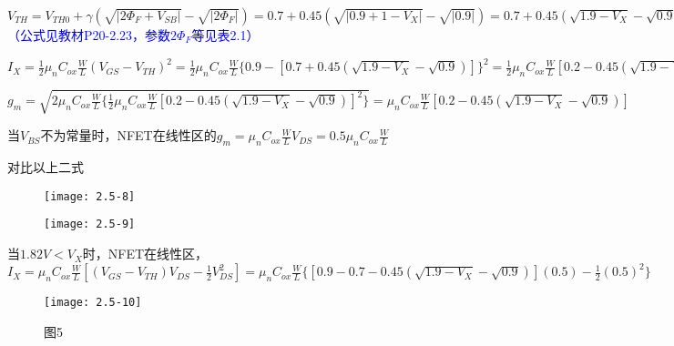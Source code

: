 {	\scalebox{3}{（e）}
	
	$V_{TH}=V_{TH0}+\gamma(\sqrt{|2\Phi_F+V_{SB}|}-\sqrt{|2\Phi_F|})=0.7+0.45(\sqrt{|0.9+1-V_{X}|}-\sqrt{|0.9|})=0.7+0.45(\sqrt{1.9-V_{X}}-\sqrt{0.9})$\textcolor{blue}{（公式见教材P20-2.23，参数$2\Phi_F$等见表2.1）}
	
	$I_X=\frac{1}{2}\mu_nC_{ox}\frac{W}{L}(V_{GS}-V_{TH})^2=\frac{1}{2}\mu_nC_{ox}\frac{W}{L}\{0.9-[0.7+0.45(\sqrt{1.9-V_{X}}-\sqrt{0.9})]\}^2=\frac{1}{2}\mu_nC_{ox}\frac{W}{L}[0.2-0.45(\sqrt{1.9-V_{X}}-\sqrt{0.9})]^2$
	
	$g_m=\sqrt{2\mu_nC_{ox}\frac{W}{L}\{\frac{1}{2}\mu_nC_{ox}\frac{W}{L}[0.2-0.45(\sqrt{1.9-V_{X}}-\sqrt{0.9})]^2\}}=\mu_nC_{ox}\frac{W}{L}[0.2-0.45(\sqrt{1.9-V_{X}}-\sqrt{0.9})]$
	
	当$V_{BS}$不为常量时，NFET在线性区的$g_m=\mu_nC_{ox}\frac{W}{L}V_{DS}=0.5\mu_nC_{ox}\frac{W}{L}$
	
	对比以上二式
	
						\begin{figure}[H] %
		\begin{minipage}{\linewidth}
			\texttt{[image: 2.5-8]}
		\end{minipage}
	\end{figure}
	
						\begin{figure}[H] %
		\begin{minipage}{\linewidth}
			\texttt{[image: 2.5-9]}
		\end{minipage}
	\end{figure}
	
	当$1.82V<V_X$时，NFET在线性区，$I_X=\mu_nC_{ox}\frac{W}{L}[(V_{GS}-V_{TH})V_{DS}-\frac{1}{2}V_{DS}^2]=\mu_nC_{ox}\frac{W}{L}\{[0.9-0.7-0.45(\sqrt{1.9-V_{X}}-\sqrt{0.9})](0.5)-\frac{1}{2}(0.5)^2\}$
	
							\begin{figure}[H] %
		\begin{minipage}{\linewidth}
			\texttt{[image: 2.5-10]}
		\end{minipage}
		\caption*{图5} %
	\end{figure}
	

	
}

